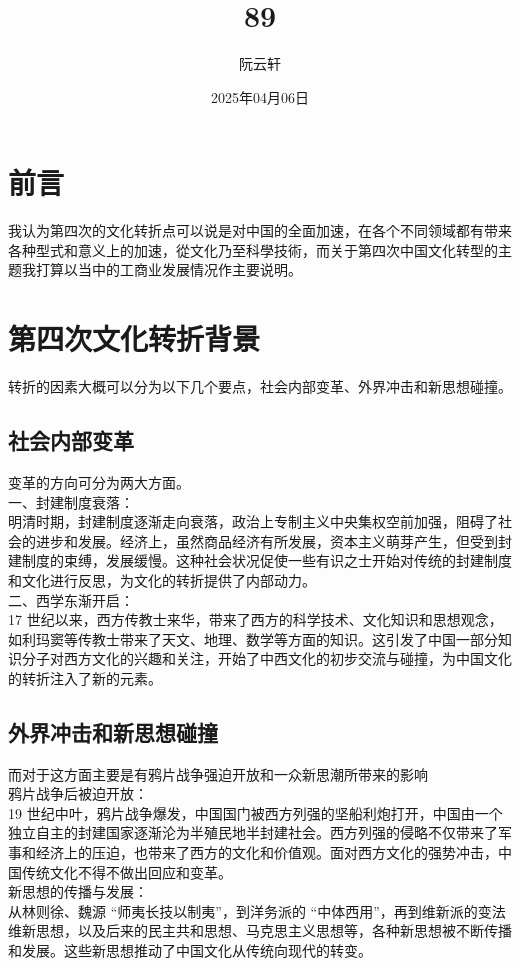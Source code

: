 \documentclass[supercite]{Experimental_Report}
\title{89}
\author{阮云轩}
\date{2025年04月06日}
\theoremstyle{definition}
\begin{document}
	
	\maketitle
	
	\clearpage
	
	
	\tableofcontents[level=2]
	
	\clearpage
	
	
	\section{前言}
	我认为第四次的文化转折点可以说是对中国的全面加速，在各个不同领域都有带来各种型式和意义上的加速，從文化乃至科學技術，而关于第四次中国文化转型的主题我打算以当中的工商业发展情况作主要说明。
	
	
	\section{第四次文化转折背景}
	转折的因素大概可以分为以下几个要点，社会内部变革、外界冲击和新思想碰撞。
	\subsection{社会内部变革}
	变革的方向可分为两大方面。\\
	一、封建制度衰落：\\明清时期，封建制度逐渐走向衰落，政治上专制主义中央集权空前加强，阻碍了社会的进步和发展。经济上，虽然商品经济有所发展，资本主义萌芽产生，但受到封建制度的束缚，发展缓慢。这种社会状况促使一些有识之士开始对传统的封建制度和文化进行反思，为文化的转折提供了内部动力。\\
	二、西学东渐开启：\\17 世纪以来，西方传教士来华，带来了西方的科学技术、文化知识和思想观念，如利玛窦等传教士带来了天文、地理、数学等方面的知识。这引发了中国一部分知识分子对西方文化的兴趣和关注，开始了中西文化的初步交流与碰撞，为中国文化的转折注入了新的元素。\\
	
	\subsection{外界冲击和新思想碰撞}
	而对于这方面主要是有鸦片战争强迫开放和一众新思潮所带来的影响\\
	鸦片战争后被迫开放：\\19 世纪中叶，鸦片战争爆发，中国国门被西方列强的坚船利炮打开，中国由一个独立自主的封建国家逐渐沦为半殖民地半封建社会。西方列强的侵略不仅带来了军事和经济上的压迫，也带来了西方的文化和价值观。面对西方文化的强势冲击，中国传统文化不得不做出回应和变革。\\
	新思想的传播与发展：\\从林则徐、魏源 “师夷长技以制夷”，到洋务派的 “中体西用”，再到维新派的变法维新思想，以及后来的民主共和思想、马克思主义思想等，各种新思想被不断传播和发展。这些新思想推动了中国文化从传统向现代的转变。
	
\end{document}
